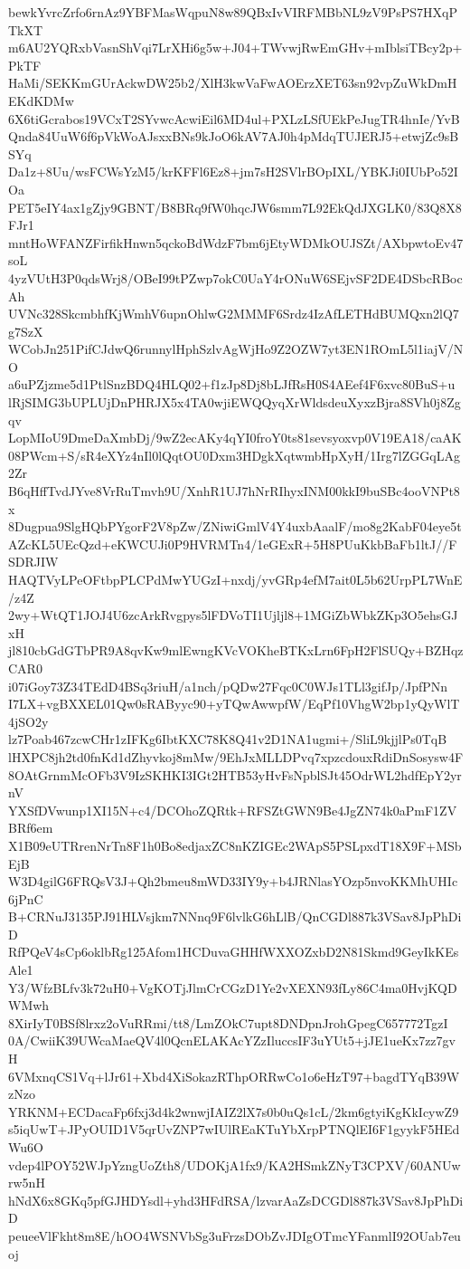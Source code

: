 bewkYvrcZrfo6rnAz9YBFMasWqpuN8w89QBxIvVIRFMBbNL9zV9PsPS7HXqPTkXT
m6AU2YQRxbVasnShVqi7LrXHi6g5w+J04+TWvwjRwEmGHv+mIblsiTBcy2p+PkTF
HaMi/SEKKmGUrAckwDW25b2/XlH3kwVaFwAOErzXET63sn92vpZuWkDmHEKdKDMw
6X6tiGcrabos19VCxT2SYvwcAcwiEil6MD4ul+PXLzLSfUEkPeJugTR4hnIe/YvB
Qnda84UuW6f6pVkWoAJsxxBNs9kJoO6kAV7AJ0h4pMdqTUJERJ5+etwjZc9sBSYq
Da1z+8Uu/wsFCWsYzM5/krKFFl6Ez8+jm7sH2SVlrBOpIXL/YBKJi0IUbPo52IOa
PET5eIY4ax1gZjy9GBNT/B8BRq9fW0hqcJW6smm7L92EkQdJXGLK0/83Q8X8FJr1
mntHoWFANZFirfikHnwn5qckoBdWdzF7bm6jEtyWDMkOUJSZt/AXbpwtoEv47soL
4yzVUtH3P0qdsWrj8/OBeI99tPZwp7okC0UaY4rONuW6SEjvSF2DE4DSbcRBocAh
UVNc328SkcmbhfKjWmhV6upnOhlwG2MMMF6Srdz4IzAfLETHdBUMQxn2lQ7g7SzX
WCobJn251PifCJdwQ6runnylHphSzlvAgWjHo9Z2OZW7yt3EN1ROmL5l1iajV/NO
a6uPZjzme5d1PtlSnzBDQ4HLQ02+f1zJp8Dj8bLJfRsH0S4AEef4F6xvc80BuS+u
lRjSIMG3bUPLUjDnPHRJX5x4TA0wjiEWQQyqXrWldsdeuXyxzBjra8SVh0j8Zgqv
LopMIoU9DmeDaXmbDj/9wZ2ecAKy4qYI0froY0ts81sevsyoxvp0V19EA18/caAK
08PWcm+S/sR4eXYz4nIl0lQqtOU0Dxm3HDgkXqtwmbHpXyH/1Irg7lZGGqLAg2Zr
B6qHffTvdJYve8VrRuTmvh9U/XnhR1UJ7hNrRIhyxINM00kkI9buSBc4ooVNPt8x
8Dugpua9SlgHQbPYgorF2V8pZw/ZNiwiGmlV4Y4uxbAaalF/mo8g2KabF04eye5t
AZcKL5UEcQzd+eKWCUJi0P9HVRMTn4/1eGExR+5H8PUuKkbBaFb1ltJ//FSDRJIW
HAQTVyLPeOFtbpPLCPdMwYUGzI+nxdj/yvGRp4efM7ait0L5b62UrpPL7WnE/z4Z
2wy+WtQT1JOJ4U6zcArkRvgpys5lFDVoTI1Ujljl8+1MGiZbWbkZKp3O5ehsGJxH
jl810cbGdGTbPR9A8qvKw9mlEwngKVcVOKheBTKxLrn6FpH2FlSUQy+BZHqzCAR0
i07iGoy73Z34TEdD4BSq3riuH/a1nch/pQDw27Fqc0C0WJs1TLl3gifJp/JpfPNn
I7LX+vgBXXEL01Qw0sRAByyc90+yTQwAwwpfW/EqPf10VhgW2bp1yQyWlT4jSO2y
lz7Poab467zcwCHr1zIFKg6IbtKXC78K8Q41v2D1NA1ugmi+/SliL9kjjlPs0TqB
lHXPC8jh2td0fnKd1dZhyvkoj8mMw/9EhJxMLLDPvq7xpzcdouxRdiDnSosysw4F
8OAtGrnmMcOFb3V9IzSKHKI3IGt2HTB53yHvFsNpblSJt45OdrWL2hdfEpY2yrnV
YXSfDVwunp1XI15N+c4/DCOhoZQRtk+RFSZtGWN9Be4JgZN74k0aPmF1ZVBRf6em
X1B09eUTRrenNrTn8F1h0Bo8edjaxZC8nKZIGEc2WApS5PSLpxdT18X9F+MSbEjB
W3D4gilG6FRQsV3J+Qh2bmeu8mWD33IY9y+b4JRNlasYOzp5nvoKKMhUHIc6jPnC
B+CRNuJ3135PJ91HLVsjkm7NNnq9F6lvlkG6hLlB/QnCGDl887k3VSav8JpPhDiD
RfPQeV4sCp6oklbRg125Afom1HCDuvaGHHfWXXOZxbD2N81Skmd9GeyIkKEsAle1
Y3/WfzBLfv3k72uH0+VgKOTjJlmCrCGzD1Ye2vXEXN93fLy86C4ma0HvjKQDWMwh
8XirIyT0BSf8lrxz2oVuRRmi/tt8/LmZOkC7upt8DNDpnJrohGpegC657772TgzI
0A/CwiiK39UWcaMaeQV4l0QcnELAKAcYZzIluccsIF3uYUt5+jJE1ueKx7zz7gvH
6VMxnqCS1Vq+lJr61+Xbd4XiSokazRThpORRwCo1o6eHzT97+bagdTYqB39WzNzo
YRKNM+ECDacaFp6fxj3d4k2wnwjIAIZ2lX7s0b0uQs1cL/2km6gtyiKgKkIcywZ9
s5iqUwT+JPyOUID1V5qrUvZNP7wIUlREaKTuYbXrpPTNQlEI6F1gyykF5HEdWu6O
vdep4lPOY52WJpYzngUoZth8/UDOKjA1fx9/KA2HSmkZNyT3CPXV/60ANUwrw5nH
hNdX6x8GKq5pfGJHDYsdl+yhd3HFdRSA/lzvarAaZsDCGDl887k3VSav8JpPhDiD
peueeVlFkht8m8E/hOO4WSNVbSg3uFrzsDObZvJDIgOTmcYFanmlI92OUab7euoj
